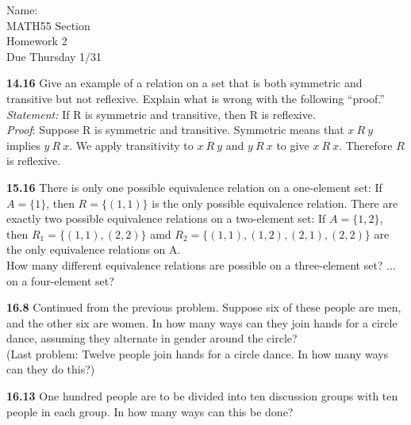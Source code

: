 \documentclass[10pt]{article}
\begin{document}

\begin{flushright}
	Name: \underline{\hspace{3cm}} \\
	MATH55 Section \underline{\hspace{0.5cm}} \\
	Homework 2 \\
	Due Thursday 1/31
\end{flushright}

\begin{framed}
	\textbf{14.16} Give an example of a relation on a set that is both symmetric and transitive but not reflexive.
Explain what is wrong with the following “proof.”\\

\indent \textit{Statement:} If R is symmetric and transitive, then R is reflexive.\\
\indent \textit{Proof}: Suppose R is symmetric and transitive. 
Symmetric means that $x\:R\:y$ implies $y\:R\:x$. We apply transitivity to $x\:R\:y$ and $y\:R\:x$ to give $x\:R\:x$. Therefore $R$ is reflexive.
\end{framed}

\pagebreak

\begin{framed}
    \textbf{15.16} There is only one possible equivalence relation on a one-element set:
    If $A = \{1\}$, then $R = \{(1,1)\}$ is the only possible equivalence relation.
    There are exactly two possible equivalence relations on a two-element set:
    If $A=\{1, 2\}$, then $R_1 = \{(1,1),(2,2)\}$ amd $R_2 = \{(1,1),(1,2),(2,1),(2,2)\}$ are
    the only equivalence relations on A.\\

    \indent How many different equivalence relations are possible on a three-element set?
    ... on a four-element set?
\end{framed}

\pagebreak

\begin{framed}
	\textbf{16.8} Continued from the previous problem. Suppose six of these people are men, and the
    other six are women. In how many ways can they join hands for a circle dance, assuming
    they alternate in gender around the circle?\\

    (Last problem: Twelve people join hands for a circle dance. In how many ways can they do this?)
\end{framed}

\pagebreak

\begin{framed}
    \textbf{16.13} One hundred people are to be divided into ten discussion groups with ten people in each group.
    In how many ways can this be done?
\end{framed}
\end{document}

